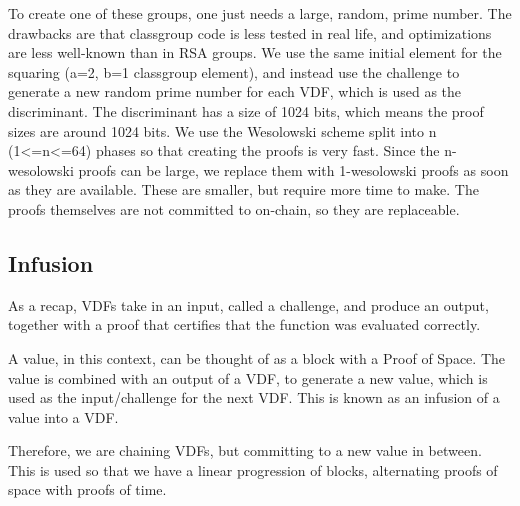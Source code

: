 \begin{flushleft}
    To create one of these groups, one just needs a large, random, prime number. The drawbacks are that classgroup code is less tested in real life, and optimizations are less well-known than in RSA groups. We use the same initial element for the squaring (a=2, b=1 classgroup element), and instead use the challenge to generate a new random prime number for each VDF, which is used as the discriminant. The discriminant has a size of 1024 bits, which means the proof sizes are around 1024 bits. We use the Wesolowski scheme split into n (1<=n<=64) phases so that creating the proofs is very fast. Since the n-wesolowski proofs can be large, we replace them with 1-wesolowski proofs as soon as they are available. These are smaller, but require more time to make. The proofs themselves are not committed to on-chain, so they are replaceable.
\end{flushleft}
\subsection{Infusion}
\begin{flushleft}
    As a recap, VDFs take in an input, called a challenge, and produce an output, together with a proof that certifies that the function was evaluated correctly.
\end{flushleft}
\begin{flushleft}
    A value, in this context, can be thought of as a block with a Proof of Space. The value is combined with an output of a VDF, to generate a new value, which is used as the input/challenge for the next VDF. This is known as an infusion of a value into a VDF.
\end{flushleft}
\begin{flushleft}
    Therefore, we are chaining VDFs, but committing to a new value in between. This is used so that we have a linear progression of blocks, alternating proofs of space with proofs of time.
\end{flushleft}

